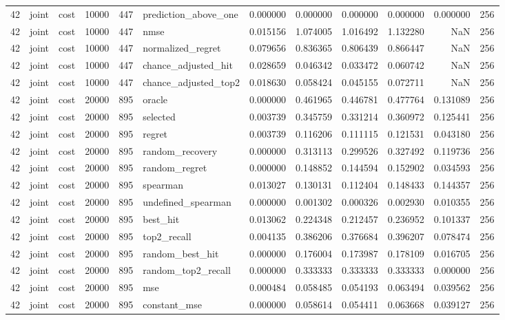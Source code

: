 \begin{tabular}{rllrrlrrrrrr}
42 & joint & cost & 10000 & 447 & prediction_above_one & 0.000000 & 0.000000 & 0.000000 & 0.000000 & 0.000000 & 256 \\
42 & joint & cost & 10000 & 447 & nmse & 0.015156 & 1.074005 & 1.016492 & 1.132280 & NaN & 256 \\
42 & joint & cost & 10000 & 447 & normalized_regret & 0.079656 & 0.836365 & 0.806439 & 0.866447 & NaN & 256 \\
42 & joint & cost & 10000 & 447 & chance_adjusted_hit & 0.028659 & 0.046342 & 0.033472 & 0.060742 & NaN & 256 \\
42 & joint & cost & 10000 & 447 & chance_adjusted_top2 & 0.018630 & 0.058424 & 0.045155 & 0.072711 & NaN & 256 \\
42 & joint & cost & 20000 & 895 & oracle & 0.000000 & 0.461965 & 0.446781 & 0.477764 & 0.131089 & 256 \\
42 & joint & cost & 20000 & 895 & selected & 0.003739 & 0.345759 & 0.331214 & 0.360972 & 0.125441 & 256 \\
42 & joint & cost & 20000 & 895 & regret & 0.003739 & 0.116206 & 0.111115 & 0.121531 & 0.043180 & 256 \\
42 & joint & cost & 20000 & 895 & random_recovery & 0.000000 & 0.313113 & 0.299526 & 0.327492 & 0.119736 & 256 \\
42 & joint & cost & 20000 & 895 & random_regret & 0.000000 & 0.148852 & 0.144594 & 0.152902 & 0.034593 & 256 \\
42 & joint & cost & 20000 & 895 & spearman & 0.013027 & 0.130131 & 0.112404 & 0.148433 & 0.144357 & 256 \\
42 & joint & cost & 20000 & 895 & undefined_spearman & 0.000000 & 0.001302 & 0.000326 & 0.002930 & 0.010355 & 256 \\
42 & joint & cost & 20000 & 895 & best_hit & 0.013062 & 0.224348 & 0.212457 & 0.236952 & 0.101337 & 256 \\
42 & joint & cost & 20000 & 895 & top2_recall & 0.004135 & 0.386206 & 0.376684 & 0.396207 & 0.078474 & 256 \\
42 & joint & cost & 20000 & 895 & random_best_hit & 0.000000 & 0.176004 & 0.173987 & 0.178109 & 0.016705 & 256 \\
42 & joint & cost & 20000 & 895 & random_top2_recall & 0.000000 & 0.333333 & 0.333333 & 0.333333 & 0.000000 & 256 \\
42 & joint & cost & 20000 & 895 & mse & 0.000484 & 0.058485 & 0.054193 & 0.063494 & 0.039562 & 256 \\
42 & joint & cost & 20000 & 895 & constant_mse & 0.000000 & 0.058614 & 0.054411 & 0.063668 & 0.039127 & 256 \\

\end{tabular}
